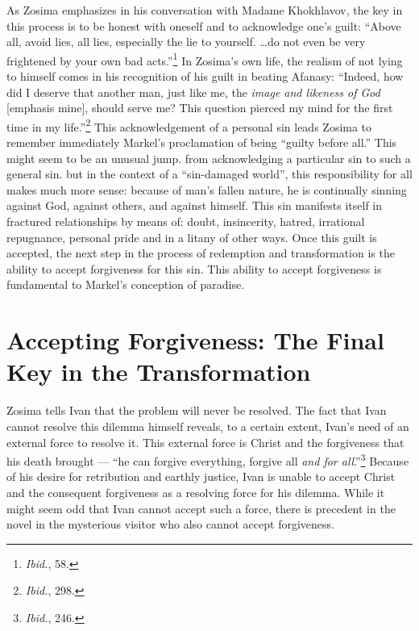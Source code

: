 As Zosima emphasizes in his conversation with Madame Khokhlavov, the key in this process is to be honest with oneself and to acknowledge one's guilt: ``Above all, avoid lies, all lies, especially the lie to yourself. \ldots do not even be very frightened by your own bad acts.''\footnote{\emph{Ibid.}, 58.} In Zosima's own life, the realism of not lying to himself comes in his recognition of his guilt in beating Afanasy: ``Indeed, how did I deserve that another man, just like me, the \emph{image and likeness of God} [emphasis mine], should serve me? This question pierced my mind for the first time in my life.''\footnote{\emph{Ibid.}, 298.} This acknowledgement of a personal sin leads Zosima to remember immediately Markel's proclamation of being ``guilty before all.'' This might seem to be an unusual jump. from acknowledging a particular sin to such a general sin. but in the context of a ``sin-damaged world'', this responsibility for all makes much more sense: because of man's fallen nature, he is continually sinning against God, against others, and against himself. This sin manifests itself in fractured relationships by means of: doubt, insincerity, hatred, irrational repugnance, personal pride and in a litany of other ways. Once this guilt is accepted, the next step in the process of redemption and transformation is the ability to accept forgiveness for this sin. This ability to accept forgiveness is fundamental to Markel's conception of paradise.

\section{Accepting Forgiveness: The Final Key in the Transformation}
Zosima tells Ivan that the problem will never be resolved. The fact that Ivan cannot resolve this dilemma himself reveals, to a certain extent, Ivan's need of an external force to resolve it. This external force is Christ and the forgiveness that his death brought --- ``he can forgive everything, forgive all \emph{and for all}.''\footnote{\emph{Ibid.}, 246.} Because of his desire for retribution and earthly justice, Ivan is unable to accept Christ and the consequent forgiveness as a resolving force for his dilemma. While it might seem odd that Ivan cannot accept such a force, there is precedent in the novel in the mysterious visitor who also cannot accept forgiveness.


